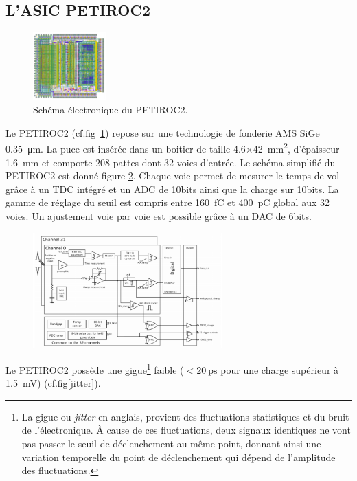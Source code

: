 \subsection{L'ASIC PETIROC2}

\begin{figure}
	\centering
	\vspace*{-1cm}
	\includegraphics[width=0.25\textwidth]{ELE/PETIROC.png}
	\caption{Schéma électronique du PETIROC2.}
	\label{PETIROC2}
\end{figure}

Le PETIROC2 (cf.fig~\ref{PETIROC2}) repose sur une technologie de fonderie AMS SiGe \SI{0.35}{\micro\meter}. La puce est insérée dans un boitier de taille \num{4.6}$\times$\SI{42}{\square\milli\meter}, d'épaisseur \SI{1.6}{\milli\meter} et comporte \num{208} pattes dont \num{32} voies d'entrée. Le schéma simplifié du PETIROC2 est donné figure \ref{SchemePETIROC}. Chaque voie permet de mesurer le temps de vol grâce à un TDC intégré et un ADC de \num{10}bits ainsi que la charge sur \num{10}bits. La gamme de réglage du seuil est compris entre \SI{160}{\femto\coulomb} et \SI{400}{\pico\coulomb} global aux \num{32} voies. Un ajustement voie par voie est possible grâce à un DAC de \num{6}bits. 

\begin{figure}[ht!]
	\centering
	\includegraphics[width=0.65\textwidth]{ELE/Scheme.png}
	\label{SchemePETIROC}
\end{figure}

Le PETIROC2 possède une gigue\footnote{La gigue ou \textit{jitter} en anglais, provient des fluctuations statistiques et du bruit de l'électronique. À cause de ces fluctuations, deux signaux identiques ne vont pas passer le seuil de déclenchement au même point, donnant ainsi une variation temporelle du point de déclenchement qui dépend de l'amplitude des fluctuations.} faible ($<\SI{20}{\pico\second}$ pour une charge supérieur à \SI{1.5}{\milli\volt}) (cf.fig\ref{jitter}).

